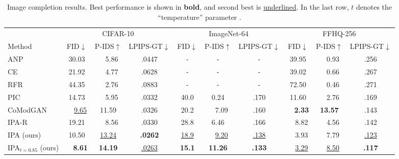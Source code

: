 \begin{table}
  \tiny
  \caption{Image completion results. Best performance is shown in \textbf{bold},
    and second best is \underline{underlined}. In the last row, $t$ denotes the
    ``temperature'' parameter \citep{child2020very}.}
  \label{tab:cigcvae-results-completion}
  \centering
  \begin{tabular}{lccccccccc}
    \toprule
    \multicolumn{1}{r}{} & \multicolumn{3}{c}{CIFAR-10}  & \multicolumn{3}{c}{ImageNet-64}  & \multicolumn{3}{c}{FFHQ-256} \\
    \cmidrule(r){2-4} \cmidrule(r){5-7} \cmidrule(r){8-10} %
    Method        & \quad FID$\downarrow$ \quad     & P-IDS$\uparrow$  & LPIPS-GT$\downarrow$ & \quad FID$\downarrow$ \quad    & P-IDS$\uparrow$  & LPIPS-GT$\downarrow$& \quad FID$\downarrow$ \quad    & P-IDS$\uparrow$  & LPIPS-GT$\downarrow$ \\
    \midrule
    ANP                        & 30.03               & ~~5.86              & .0447                         & -                 & -                 & -                & 39.95              & ~~0.93              & .256 \\
    CE                         & 21.92               & ~~4.77              & .0628                         & -                 & -                 & -                & 39.02              & ~~0.66              & .267 \\
    RFR                        & 44.35               & ~~2.76              & .0883                         & -                 & -                   & -              & 72.50              & ~~0.46              & .271 \\
    PIC                        & 14.73               & ~~5.95              & .0332                         & 40.0              & 0.24                & .170           & 11.60              & ~~2.76              & .169 \\
    CoModGAN                   & ~~\underline{9.65}  & 11.59               & .0326                         & 20.2              & ~~7.09              & .160           & ~~\textbf{2.33}    & \textbf{13.57}      & .143 \\
    IPA-R                      & 19.21               & ~~8.56              & .0330                         & 28.8              & 6.46                & .166           & ~~8.82             & ~~4.56              & .142 \\
    IPA (ours)                 & 10.50               & \underline{13.24}   & \textbf{.0262}                & \underline{18.9}  & ~~\underline{9.20}  & \underline{.138}  & ~~3.93             & ~~7.79              & \underline{.123} \\
    IPA$_{t=0.85}$ (ours)      & ~~\textbf{8.61}     & \textbf{14.19}      & \underline{.0263}             & \textbf{15.1}     & \textbf{11.26}    & \textbf{.133}     & ~~\underline{3.29} & ~~\underline{8.50}  & \textbf{.117} \\
    \bottomrule
  \end{tabular}
  \vspace{-1em}
\end{table}


